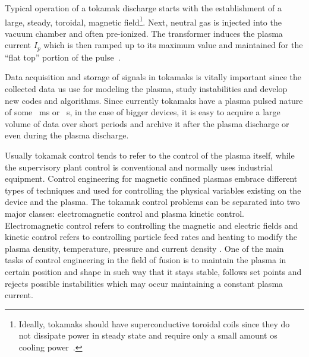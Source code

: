 Typical operation of a tokamak discharge starts with the establishment of a large, steady, toroidal, magnetic field\footnote{Ideally, tokamaks should have superconductive toroidal coils since they do not dissipate power in steady state and require only a small amount os cooling power~\cite[Chapter~5]{Freidberg2007}.}. Next, neutral gas is injected into the vacuum chamber and often pre-ionized. The transformer induces the plasma current $I_p$ which is then ramped up to its maximum value and maintained for the “flat top” portion of the pulse~\cite[Chapter~13]{Freidberg2007}. \smallskip

Data acquisition and storage of signals in tokamaks is vitally important since the collected data us use for modeling the plasma, study instabilities and develop new codes and algorithms. Since currently tokamaks have a plasma pulsed nature of some ~ms or ~s, in the case of bigger devices, it is easy to acquire a large volume of data over short periods and archive it after the plasma discharge or even during the plasma discharge. \smallskip

Usually tokamak control tends to refer to the control of the plasma itself, while the supervisory plant control is conventional and normally uses industrial equipment. Control engineering for magnetic confined plasmas  embrace different types of techniques and used for  controlling the  physical variables existing on the device and the plasma. The tokamak control problems can be separated into two major classes: electromagnetic control and plasma kinetic control. Electromagnetic control refers to controlling the magnetic and electric fields and kinetic control refers to controlling particle feed rates and heating to modify the plasma density, temperature, pressure and current density \cite[Chapter~1]{PirontiBook}.  One of the main tasks of control engineering in the field of fusion is to maintain the plasma in certain position and shape in such way that it stays stable, follows set points and rejects possible instabilities which may occur maintaining a constant plasma current. \smallskip

